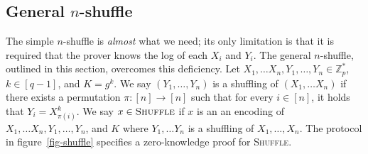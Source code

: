 \documentclass[letter]{article}
\newcommand{\Zmodp}{\mathbb{Z}_p}
\begin{document}
\subsection{General $n$-shuffle} \label{sec-shuffle}
The simple $n$-shuffle is \emph{almost} what we need; its only limitation is
that it is required that the prover knows the log of each $X_i$ and $Y_i$. The
general $n$-shuffle, outlined in this section, overcomes this deficiency.
Let $X_1, \dots X_n, Y_1, \dots, Y_n \in \Zmodp^*$, $k \in [q-1]$, and $K =
g^k$. We say $(Y_1, \dots, Y_n)$ is a shuffling of $(X_1, \dots X_n)$ if there
exists a permutation $\pi : [n] \to [n]$ such that for every $i \in [n]$, it
holds that $Y_i = X_{\pi(i)}^k$. We say $x \in \textsc{Shuffle}$ if $x$ is an
an encoding of $X_1, \dots X_n, Y_1, \dots, Y_n$, and $K$ where $Y_1, \dots Y_n$ is a
shuffling of $X_1, \dots, X_n$. The protocol in
figure~\ref{fig-shuffle} specifies a zero-knowledge proof for \textsc{Shuffle}.
\end{document}
